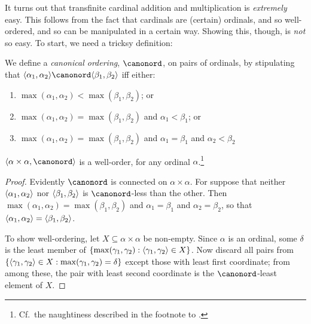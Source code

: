 \documentclass[../../../include/open-logic-section]{subfiles}
\begin{document}


It turns out that transfinite cardinal addition and multiplication is
\emph{extremely} easy. This follows from the fact that cardinals are
(certain) ordinals, and so well-ordered, and so can be manipulated in
a certain way. Showing this, though, is \emph{not} so easy. To start,
we need a tricksy definition:

\begin{defn}
We define a \emph{canonical ordering}, $\canonord$, on pairs of
ordinals, by stipulating that $\tuple{\alpha_1, \alpha_2} \canonord
\tuple{\beta_1, \beta_2}$ iff either:
\begin{enumerate}
	\item $\max(\alpha_1, \alpha_2) < \max(\beta_1, \beta_2)$; or
	\item $\max(\alpha_1, \alpha_2) = \max(\beta_1, \beta_2)$ and
	$\alpha_1 < \beta_1$; or
	\item $\max(\alpha_1, \alpha_2) = \max(\beta_1, \beta_2)$ and
	$\alpha_1 = \beta_1$ and $\alpha_2 < \beta_2$
\end{enumerate}
\end{defn}

\begin{lem}
$\tuple{\alpha \times \alpha, \canonord}$ is a well-order, for any
ordinal $\alpha$.\footnote{Cf.\ the naughtiness described in the
footnote to .}
\end{lem}

\begin{proof}
Evidently $\canonord$ is connected on $\alpha \times \alpha$. For
suppose that neither $\langle \alpha_1, \alpha_2 \rangle$ nor $\langle \beta_1,
\beta_2 \rangle$ is $\canonord$-less than the other. Then $\max(\alpha_1,
\alpha_2) = \max(\beta_1, \beta_2)$ and $\alpha_1 = \beta_1$ and
$\alpha_2 = \beta_2$, so that $\langle \alpha_1, \alpha_2 \rangle =
\langle \beta_1,  \beta_2 \rangle$.

To show well-ordering, let $X \subseteq \alpha\times\alpha$ be
non-empty. Since $\alpha$ is an ordinal, some $\delta$ is the least
member of $\{ \max(\gamma_1, \gamma_2) : \langle \gamma_1,
\gamma_2 \rangle \in X \}$. Now discard all pairs from
$\{ \langle \gamma_1,\gamma_2 \rangle \in X : \max(\gamma_1, \gamma_2) =
\delta \}$ except those with least first coordinate; from among these,
the pair with least second coordinate is the $\canonord$-least element
of $X$.
\end{proof}
\end{document}
